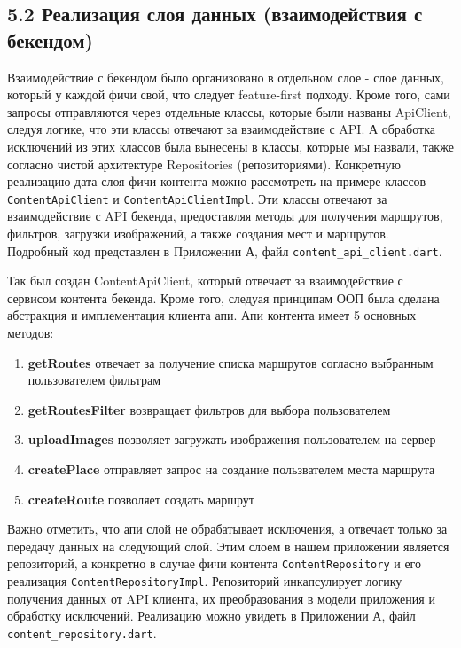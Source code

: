 \subsection*{5.2 Реализация слоя данных (взаимодействия с бекендом)}
Взаимодействие с бекендом было организовано в отдельном слое - слое данных, который у каждой фичи свой, что следует feature-first подходу. Кроме того, сами запросы отправляются через отдельные классы, которые были названы ApiClient, следуя логике, что эти классы отвечают за взаимодействие с API. А обработка исключений из этих классов была вынесены в классы, которые мы назвали, также согласно чистой архитектуре Repositories (репозиториями). Конкретную реализацию дата слоя фичи контента можно рассмотреть на примере классов \texttt{ContentApiClient} и \texttt{ContentApiClientImpl}. Эти классы отвечают за взаимодействие с API бекенда, предоставляя методы для получения маршрутов, фильтров, загрузки изображений, а также создания мест и маршрутов. Подробный код представлен в Приложении А, файл \texttt{content\_api\_client.dart}.

Так был создан ContentApiClient, который отвечает за взаимодействие с сервисом контента бекенда. Кроме того, следуая принципам ООП была сделана абстракция и имплементация клиента апи. Апи контента имеет 5 основных методов:

\begin{enumerate}
    \item \textbf{getRoutes} отвечает за получение списка маршрутов согласно выбранным пользователем фильтрам
    \item \textbf{getRoutesFilter} возвращает фильтров для выбора пользователем
    \item \textbf{uploadImages} позволяет загружать изображения пользователем на сервер
    \item \textbf{createPlace} отправляет запрос на создание пользвателем места маршрута
    \item \textbf{createRoute} позволяет создать маршрут
\end{enumerate}

Важно отметить, что апи слой не обрабатывает исключения, а отвечает только за передачу данных на следующий слой. Этим слоем в нашем приложении является репозиторий, а конкретно в случае фичи контента \texttt{ContentRepository} и его реализация \texttt{ContentRepositoryImpl}. Репозиторий инкапсулирует логику получения данных от API клиента, их преобразования в модели приложения и обработку исключений. Реализацию можно увидеть в Приложении А, файл \texttt{content\_repository.dart}.

